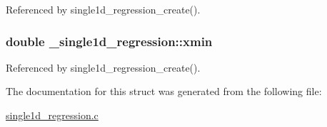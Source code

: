 Referenced by single1d\+\_\+regression\+\_\+create().

\subsubsection[{\texorpdfstring{xmin}{xmin}}]{\setlength{\rightskip}{0pt plus 5cm}double \+\_\+single1d\+\_\+regression\+::xmin}\hypertarget{struct__single1d__regression_aaecbe6a0675eea847ce7da5994ec97e0}{}\label{struct__single1d__regression_aaecbe6a0675eea847ce7da5994ec97e0}


Referenced by single1d\+\_\+regression\+\_\+create().



The documentation for this struct was generated from the following file\+:\begin{DoxyCompactItemize}
\item 
\hyperlink{single1d__regression_8c}{single1d\+\_\+regression.\+c}\end{DoxyCompactItemize}
